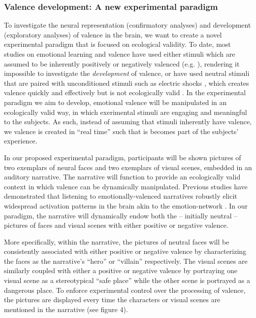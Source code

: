 \documentclass[12pt,a4paper]{article}\usepackage[]{graphicx}\usepackage[]{color}
\begin{document}
\subsubsection{Valence development: A new experimental paradigm}
To investigate the neural representation (confirmatory analyses) and development (exploratory analyses) of valence in the brain, we want to create a novel experimental paradigm that is focused on ecological validity. To date, most studies on emotional learning and valence have used either stimuli which are assumed to be inherently positively or negatively valenced (e.g. \citealp{baucom2012,aldhafeeri2012}), rendering it impossible to investigate the \emph{development} of valence, or have used neutral stimuli that are paired with unconditioned stimuli such as electric shocks \citep{visser2013}, which creates valence quickly and effectively but is not ecologically valid \citep{spiers2007}. In the experimental paradigm we aim to develop, emotional valence will be manipulated in an ecologically valid way, in which exerimental stimuli are engaging and meaningful to the subjects. As such, instead of assuming that stimuli inherently have valence, we valence is created in ``real time'' such that is becomes part of the subjects' experience.  

In our proposed experimental paradigm, participants will be shown pictures of two exemplars of neural faces and two exemplars of visual scenes, embedded in an auditory narrative. The narrative will function to provide an ecologically valid context in which valence can be dynamically manipulated. Previous studies have demonstrated that listening to emotionally-valenced narratives robustly elicit widespread activation patterns in the brain \citep{nijhof2015,mar2011} akin to the emotion-network \citep{sabatinelli2006}. In our paradigm, the narrative will dynamically endow both the -- initially neutral -- pictures of faces and visual scenes with either positive or negative valence. 

More specifically, within the narrative, the pictures of neutral faces will be consistently associated with either positive or negative valence by characterizing the faces as the narrative's ``hero'' or ``villain'' respectively. The visual scenes are similarly coupled with either a positive or negative valence by portraying one visual scene as a stereotypical ``safe place'' while the other scene is portrayed as a dangerous place. To enforce experimental control over the processing of valence, the pictures are displayed every time the characters or visual scenes are mentioned in the narrative (see figure 4).
\end{document}
